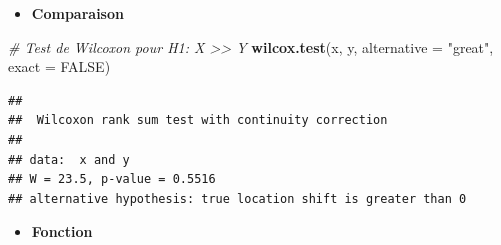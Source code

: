 \documentclass[
  12pt,
]{article}
\newenvironment{Shaded}{\begin{snugshade}}{\end{snugshade}}
\newcommand{\AttributeTok}[1]{\textcolor[rgb]{0.13,0.29,0.53}{#1}}
\newcommand{\CommentTok}[1]{\textcolor[rgb]{0.56,0.35,0.01}{\textit{#1}}}
\newcommand{\ConstantTok}[1]{\textcolor[rgb]{0.56,0.35,0.01}{#1}}
\newcommand{\FunctionTok}[1]{\textcolor[rgb]{0.13,0.29,0.53}{\textbf{#1}}}
\newcommand{\NormalTok}[1]{#1}
\newcommand{\StringTok}[1]{\textcolor[rgb]{0.31,0.60,0.02}{#1}}
\providecommand{\tightlist}{%
  \setlength{\itemsep}{0pt}\setlength{\parskip}{0pt}}
\begin{document}
\begin{itemize}
\tightlist
\item
  \textbf{Comparaison}
\end{itemize}

\begin{Shaded}
\begin{Highlighting}[]
\CommentTok{\# Test de Wilcoxon pour H1: X \textgreater{}\textgreater{} Y}
\FunctionTok{wilcox.test}\NormalTok{(x, y, }\AttributeTok{alternative =} \StringTok{"great"}\NormalTok{, }\AttributeTok{exact =} \ConstantTok{FALSE}\NormalTok{)}
\end{Highlighting}
\end{Shaded}

\begin{verbatim}
## 
##  Wilcoxon rank sum test with continuity correction
## 
## data:  x and y
## W = 23.5, p-value = 0.5516
## alternative hypothesis: true location shift is greater than 0
\end{verbatim}

\begin{itemize}
\tightlist
\item
  \textbf{Fonction}
\end{itemize}
\end{document}
